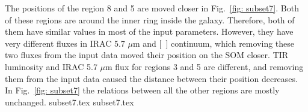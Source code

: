         The positions of the region 8 and 5 are moved closer in Fig.~\ref{fig: subset7}.
        Both of these regions are around the inner ring inside the galaxy.
        Therefore, both of them have similar values in most of the input parameters.
        However, they have very different fluxes in IRAC 5.7 $\mu$m and [~\sii] continuum, which removing these two fluxes from the input data moved their position on the SOM closer.
        TIR luminosity and IRAC 5.7 $\mu$m flux for regions 3 and 5 are different, and removing them from the input data caused the distance between their position decreases. 
        In Fig.~\ref{fig: subset7} the relations between all the other regions are mostly unchanged.
        {subset7.tex}
        {subset7.tex}
        